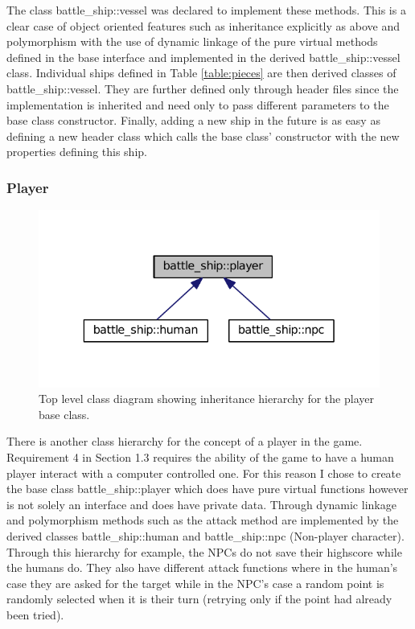\documentclass[11pt]{article} %
\begin{document}
The class battle\_ship::vessel was declared to implement these methods.
This is a clear case of object oriented features such as inheritance explicitly as above
and polymorphism with the use of dynamic linkage of the pure virtual methods defined in the base interface and implemented in the derived battle\_ship::vessel class.
Individual ships defined in Table \ref{table:pieces} are then derived classes of battle\_ship::vessel.
They are further defined only through header files since the implementation is inherited and need only to pass different parameters to the base class constructor.
Finally, adding a new ship in the future is as easy as defining a new header class which calls the base class' constructor with the new properties defining this ship.

\subsubsection{Player}
\begin{figure}[H]
\centering
\includegraphics[scale=0.6]{images/player.pdf}
\caption{Top level class diagram showing inheritance hierarchy for the player base class.}
\label{fig:piece_class_diagram}
\end{figure}
There is another class hierarchy for the concept of a player in the game.
Requirement 4 in Section 1.3 requires the ability of the game to have a human player interact with a computer controlled one.
For this reason I chose to create the base class battle\_ship::player which does have pure virtual functions
however is not solely an interface and does have private data.
Through dynamic linkage and polymorphism methods such as the attack method are implemented by the derived classes
battle\_ship::human and battle\_ship::npc (Non-player character).
Through this hierarchy for example, the NPCs do not save their highscore while the humans do.
They also have different attack functions where in the human's case they are asked for the target
while in the NPC's case a random point is randomly selected when it is their turn (retrying only if the point had already been tried).
\end{document}
